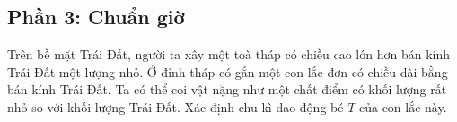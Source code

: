 \subsection*{Phần 3: Chuẩn giờ}
\noindent Trên bề mặt Trái Đất, người ta xây một toà tháp có chiều cao lớn hơn bán kính Trái Đất một lượng nhỏ. Ở đỉnh tháp có gắn một con lắc đơn có chiều dài bằng bán kính Trái Đất. Ta có thể coi vật nặng như một chất điểm có khối lượng rất nhỏ so với khối lượng Trái Đất. Xác định chu kì dao động bé $T$ của con lắc này.